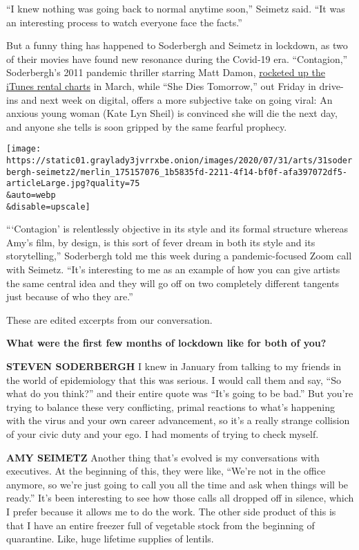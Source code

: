 ``I knew nothing was going back to normal anytime soon,'' Seimetz said.
``It was an interesting process to watch everyone face the facts.''

But a funny thing has happened to Soderbergh and Seimetz in lockdown, as
two of their movies have found new resonance during the Covid-19 era.
``Contagion,'' Soderbergh's 2011 pandemic thriller starring Matt Damon,
\href{https://www.nytimes3xbfgragh.onion/2020/03/04/business/media/coronavirus-contagion-movie.html}{rocketed
up the iTunes rental charts} in March, while ``She Dies Tomorrow,'' out
Friday in drive-ins and next week on digital, offers a more subjective
take on going viral: An anxious young woman (Kate Lyn Sheil) is
convinced she will die the next day, and anyone she tells is soon
gripped by the same fearful prophecy.

\texttt{[image: https://static01.graylady3jvrrxbe.onion/images/2020/07/31/arts/31soderbergh-seimetz2/merlin\_175157076\_1b5835fd-2211-4f14-bf0f-afa397072df5-articleLarge.jpg?quality=75\\\&auto=webp\\\&disable=upscale]}

```Contagion' is relentlessly objective in its style and its formal
structure whereas Amy's film, by design, is this sort of fever dream in
both its style and its storytelling,'' Soderbergh told me this week
during a pandemic-focused Zoom call with Seimetz. ``It's interesting to
me as an example of how you can give artists the same central idea and
they will go off on two completely different tangents just because of
who they are.''

These are edited excerpts from our conversation.

\textbf{What were the first few months of lockdown like for both of
you?}

\textbf{STEVEN SODERBERGH} I knew in January from talking to my friends
in the world of epidemiology that this was serious. I would call them
and say, ``So what do you think?'' and their entire quote was ``It's
going to be bad.'' But you're trying to balance these very conflicting,
primal reactions to what's happening with the virus and your own career
advancement, so it's a really strange collision of your civic duty and
your ego. I had moments of trying to check myself.

\textbf{AMY SEIMETZ} Another thing that's evolved is my conversations
with executives. At the beginning of this, they were like, ``We're not
in the office anymore, so we're just going to call you all the time and
ask when things will be ready.'' It's been interesting to see how those
calls all dropped off in silence, which I prefer because it allows me to
do the work. The other side product of this is that I have an entire
freezer full of vegetable stock from the beginning of quarantine. Like,
huge lifetime supplies of lentils.

